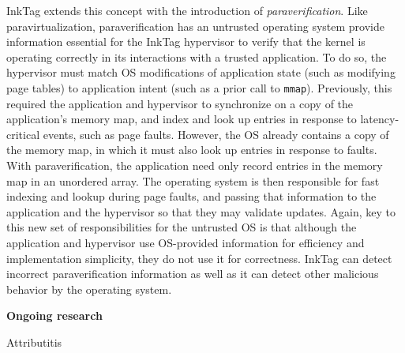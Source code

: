 \documentclass{article}
\newcommand{\inktag}{InkTag\xspace}
\newcommand{\codeid}[1]{{\fontsize{9pt}{12pt}\tt #1}}
\begin{document}
\inktag extends this concept with the introduction of
\emph{paraverification}. Like paravirtualization, paraverification has an
untrusted operating system provide information essential for the \inktag
hypervisor to verify that the kernel is operating correctly in its
interactions with a trusted application. To do so, the hypervisor must
match OS modifications of application state (such as modifying page tables) to
application intent (such as a prior call to \codeid{mmap}). Previously, this
required the application and hypervisor to synchronize on a copy of the
application's memory map, and index and look up entries in response to
latency-critical events, such as page faults. However, the OS already
contains a copy of the memory map, in which it must also look up entries in
response to faults. With paraverification, the application need only record
entries in the memory map in an unordered array. The operating system is
then responsible for fast indexing and lookup during page faults, and
passing that information to the application and the hypervisor so that they
may validate updates. Again, key to this new set of responsibilities for
the untrusted OS is that although the application and hypervisor use
OS-provided information for efficiency and implementation simplicity, they
do not use it for correctness. \inktag can detect incorrect
paraverification information as well as it can detect other malicious
behavior by the operating system.

{\bigskip \noindent \bf Ongoing research}

\noindent Attributitis
\end{document}
